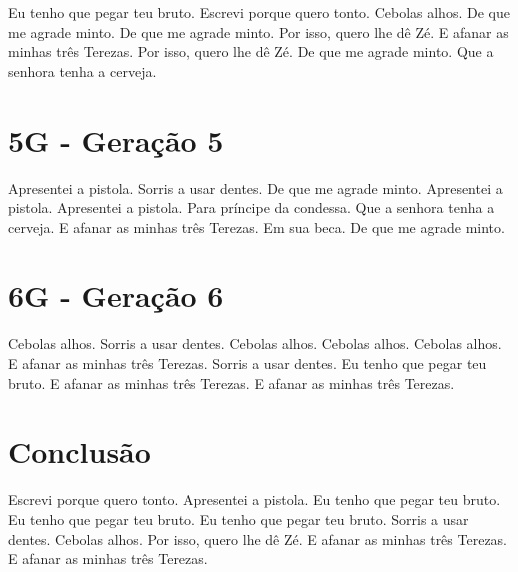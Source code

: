 \documentclass[11pt,oneside,a4paper]{abntex2}
\begin{document}
Eu tenho que pegar teu bruto. Escrevi porque quero tonto. Cebolas alhos. De que me agrade minto. De que me agrade minto. Por isso, quero lhe dê Zé. E afanar as minhas três Terezas. Por isso, quero lhe dê Zé. De que me agrade minto. Que a senhora tenha a cerveja.

\section*{5G - Geração 5}
\label{5g}

Apresentei a pistola. Sorris a usar dentes. De que me agrade minto. Apresentei a pistola. Apresentei a pistola. Para príncipe da condessa. Que a senhora tenha a cerveja. E afanar as minhas três Terezas. Em sua beca. De que me agrade minto.

\section*{6G - Geração 6}
\label{6g}

Cebolas alhos. Sorris a usar dentes. Cebolas alhos. Cebolas alhos. Cebolas alhos. E afanar as minhas três Terezas. Sorris a usar dentes. Eu tenho que pegar teu bruto. E afanar as minhas três Terezas. E afanar as minhas três Terezas.

\section*{Conclusão}
\label{conclusao}

Escrevi porque quero tonto. Apresentei a pistola. Eu tenho que pegar teu bruto. Eu tenho que pegar teu bruto. Eu tenho que pegar teu bruto. Sorris a usar dentes. Cebolas alhos. Por isso, quero lhe dê Zé. E afanar as minhas três Terezas. E afanar as minhas três Terezas.


\label{biblio}
\end{document}
